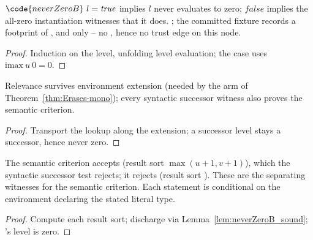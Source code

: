 \begin{lemma}
\label{lem:neverZeroB_sound}
\leanok
{}
 $\code{neverZeroB}\ l = \mathit{true}$ implies $l$ never evaluates to zero; $\mathit{false}$ implies the all-zero instantiation witnesses that it does.
 \stProved{}; the committed fixture  records a footprint of ,  and  only -- no , hence no trust edge on this node.
\end{lemma}
\begin{proof}
\leanok
{}
 Induction on the level, unfolding level evaluation; the  case uses $\mathrm{imax}\ u\ 0 = 0$.
\end{proof}

\begin{lemma}
\label{lem:InformativeInd-mono}
\leanok
{}
 Relevance survives environment extension (needed by the  arm of Theorem~\ref{thm:Erases-mono}); every syntactic successor witness also proves the semantic criterion.
\end{lemma}
\begin{proof}
\leanok
{}
 Transport the lookup along the extension; a successor level stays a successor, hence never zero.
\end{proof}

\begin{lemma}
\label{lem:informativeInd_prod}
\leanok
{}
 The semantic criterion accepts  (result sort $\max(u{+}1,v{+}1)$), which the syntactic successor test rejects; it rejects  (result sort ). These are the separating witnesses for the semantic criterion.
 Each statement is conditional on the environment declaring the stated literal type.
\end{lemma}
\begin{proof}
\leanok
{}
 Compute each result sort; discharge  via Lemma~\ref{lem:neverZeroB_sound}; 's level is zero.
\end{proof}

